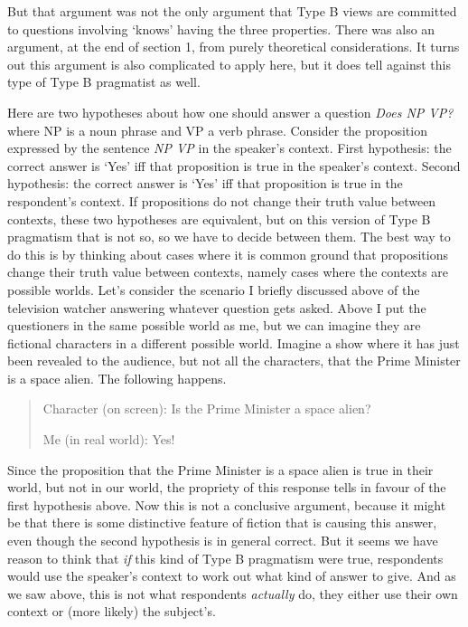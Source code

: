 But that argument was not the only argument that Type B views are committed to questions involving `knows' having the three properties. There was also an argument, at the end of section 1, from purely theoretical considerations. It turns out this argument is also complicated to apply here, but it does tell against this type of Type B pragmatist as well.

Here are two hypotheses about how one should answer a question \textit{Does NP VP?} where NP is a noun phrase and VP a verb phrase. Consider the proposition expressed by the sentence \textit{NP VP} in the speaker's context. First hypothesis: the correct answer is `Yes' iff that proposition is true in the speaker's context. Second hypothesis: the correct answer is `Yes' iff that proposition is true in the respondent's context. If propositions do not change their truth value between contexts, these two hypotheses are equivalent, but on this version of Type B pragmatism that is not so, so we have to decide between them. The best way to do this is by thinking about cases where it is common ground that propositions change their truth value between contexts, namely cases where the contexts are possible worlds. Let's consider the scenario I briefly discussed above of the television watcher answering whatever question gets asked. Above I put the questioners in the same possible world as me, but we can imagine they are fictional characters in a different possible world. Imagine a show where it has just been revealed to the audience, but not all the characters, that the Prime Minister is a space alien. The following happens.

\begin{quote}
Character (on screen): Is the Prime Minister a space alien?

Me (in real world): Yes!
\end{quote}

\noindent Since the proposition that the Prime Minister is a space alien is true in their world, but not in our world, the propriety of this response tells in favour of the first hypothesis above. Now this is not a conclusive argument, because it might be that there is some distinctive feature of fiction that is causing this answer, even though the second hypothesis is in general correct. But it seems we have reason to think that \textit{if} this kind of Type B pragmatism were true, respondents would use the speaker's context to work out what kind of answer to give. And as we saw above, this is not what respondents \textit{actually} do, they either use their own context or (more likely) the subject's.

